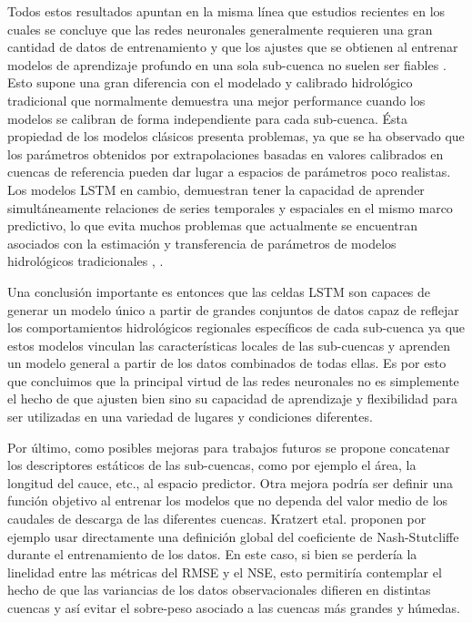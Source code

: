 Todos estos resultados apuntan en la misma línea que estudios recientes en los cuales se concluye que 
las redes neuronales generalmente requieren una gran cantidad de datos de entrenamiento y que 
los ajustes que se obtienen al entrenar modelos de aprendizaje profundo en una sola sub-cuenca no suelen ser fiables \cite{Kratzert}. 
Esto supone una gran diferencia con el modelado y calibrado hidrológico tradicional que normalmente demuestra una mejor performance 
cuando los modelos se calibran de forma independiente para cada sub-cuenca.
Ésta propiedad de los modelos clásicos presenta problemas, ya que se ha observado que los 
 parámetros obtenidos por extrapolaciones  basadas en valores calibrados en cuencas de referencia 
pueden dar lugar a espacios de parámetros poco realistas\cite{Mizukami}. 
Los modelos LSTM en cambio, demuestran tener la capacidad de aprender simultáneamente relaciones de series temporales 
y espaciales en el mismo marco predictivo, lo que evita muchos problemas que actualmente se encuentran 
asociados con la estimación y transferencia de parámetros de modelos hidrológicos tradicionales \cite{Kratzert}, \cite{nearing}.

Una conclusión importante es entonces que las celdas LSTM son capaces de generar un modelo único a partir de grandes conjuntos de datos  
capaz de reflejar los comportamientos hidrológicos regionales específicos de cada sub-cuenca
ya que estos modelos  vinculan las características locales de las sub-cuencas y aprenden
un modelo general a partir de los datos combinados de todas ellas. 
Es por esto que concluimos que la principal virtud de las redes neuronales no es simplemente el hecho de que ajusten bien sino su capacidad de
aprendizaje y  flexibilidad para ser utilizadas en una variedad de  lugares y condiciones diferentes.


Por último, como posibles mejoras para trabajos futuros se propone concatenar los descriptores estáticos de las sub-cuencas, 
como por ejemplo el área, la longitud del cauce, etc., al espacio predictor. Otra mejora podría ser definir una función objetivo al 
entrenar los modelos que no dependa del valor medio de los caudales de descarga de las diferentes cuencas. Kratzert etal. \cite{Kratzert} 
proponen por ejemplo usar directamente una definición global del coeficiente de Nash-Stutcliffe durante el entrenamiento
de los datos. En este caso, si bien se perdería la linelidad entre las métricas del RMSE y el NSE,  esto permitiría 
contemplar el hecho de que las variancias de los datos observacionales difieren en distintas cuencas y así evitar el sobre-peso 
asociado a las cuencas más grandes y húmedas.
